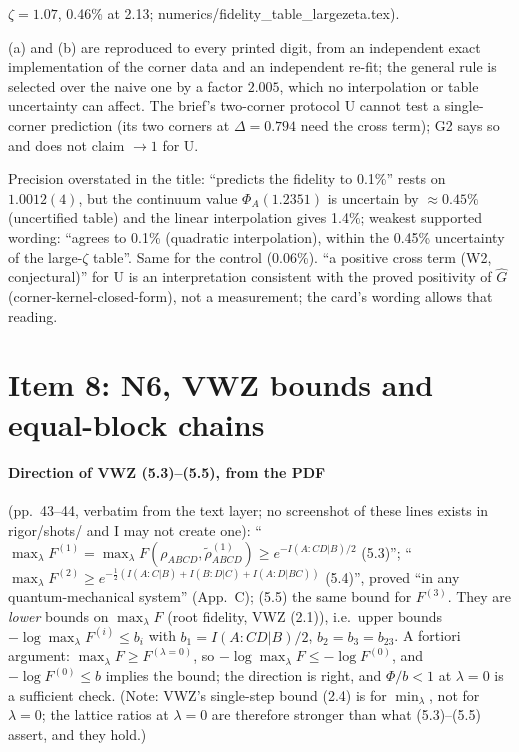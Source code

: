 \documentclass[11pt]{article}
\begin{document}
$\zeta=1.07$, 0.46\% at 2.13; numerics/fidelity\_table\_largezeta.tex).
\begin{verdictok}
(a) and (b) are reproduced to every printed digit, from an independent exact implementation of the corner data
and an independent re-fit; the general rule is selected over the naive one by a factor $2.005$, which no
interpolation or table uncertainty can affect. The brief's two-corner protocol U cannot test a single-corner
prediction (its two corners at $\Delta=0.794$ need the cross term); G2 says so and does not claim $\to1$ for U.
\end{verdictok}
\begin{verdictgap}
Precision overstated in the title: ``predicts the fidelity to 0.1\%'' rests on $1.0012(4)$, but the continuum value
$\Phi_A(1.2351)$ is uncertain by $\approx0.45\%$ (uncertified table) and the linear interpolation gives 1.4\%;
weakest supported wording: ``agrees to 0.1\% (quadratic interpolation), within the 0.45\% uncertainty of the
large-$\zeta$ table''. Same for the control (0.06\%). ``a positive cross term (W2, conjectural)'' for U is an
interpretation consistent with the proved positivity of $\hat G$ (corner-kernel-closed-form), not a measurement;
the card's wording allows that reading.
\end{verdictgap}

\section{Item 8: N6, VWZ bounds and equal-block chains}\label{sec:i8}
\paragraph{Direction of VWZ (5.3)--(5.5), from the PDF} (pp.~43--44, verbatim from the text layer; no screenshot
of these lines exists in rigor/shots/ and I may not create one): ``$\max_\lambda F^{(1)}=\max_\lambda
F(\rho_{ABCD},\tilde\rho^{(1)}_{ABCD})\ge e^{-I(A:CD|B)/2}$ (5.3)''; ``$\max_\lambda F^{(2)}\ge
e^{-\frac12(I(A:C|B)+I(B:D|C)+I(A:D|BC))}$ (5.4)'', proved ``in any quantum-mechanical system'' (App.~C); (5.5)
the same bound for $F^{(3)}$. They are \emph{lower} bounds on $\max_\lambda F$ (root fidelity, VWZ (2.1)), i.e.\
upper bounds $-\log\max_\lambda F^{(i)}\le b_i$ with $b_1=I(A{:}CD|B)/2$, $b_{2}=b_3=b_{23}$. A fortiori argument:
$\max_\lambda F\ge F^{(\lambda=0)}$, so $-\log\max_\lambda F\le-\log F^{(0)}$, and $-\log F^{(0)}\le b$ implies the
bound; the direction is right, and $\Phi/b<1$ at $\lambda=0$ is a sufficient check. (Note: VWZ's single-step bound
(2.4) is for $\min_\lambda$, not for $\lambda=0$; the lattice ratios at $\lambda=0$ are therefore stronger than
what (5.3)--(5.5) assert, and they hold.)
\end{document}
